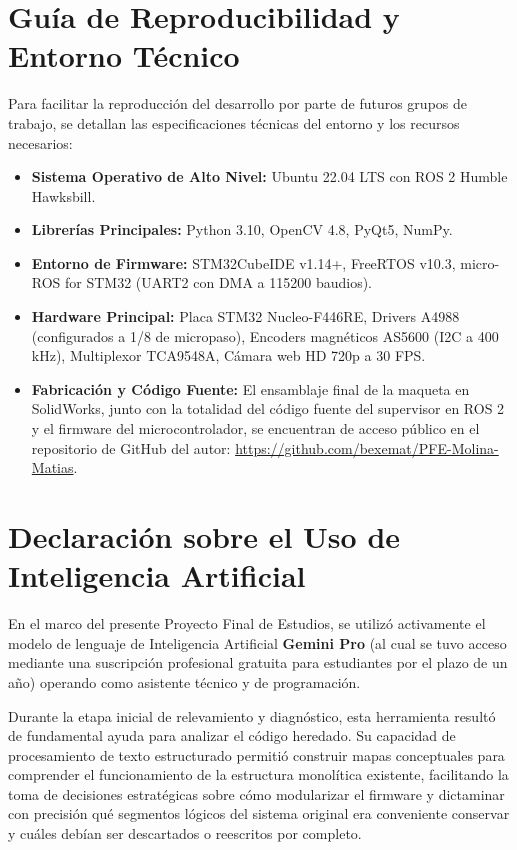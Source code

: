 \documentclass[12pt, a4paper]{report}
\begin{document}
\section{Guía de Reproducibilidad y Entorno Técnico}
Para facilitar la reproducción del desarrollo por parte de futuros grupos de trabajo, se detallan las especificaciones técnicas del entorno y los recursos necesarios:
\begin{itemize}
    \item \textbf{Sistema Operativo de Alto Nivel:} Ubuntu 22.04 LTS con ROS 2 Humble Hawksbill.
    \item \textbf{Librerías Principales:} Python 3.10, OpenCV 4.8, PyQt5, NumPy.
    \item \textbf{Entorno de Firmware:} STM32CubeIDE v1.14+, FreeRTOS v10.3, micro-ROS for STM32 (UART2 con DMA a 115200 baudios).
    \item \textbf{Hardware Principal:} Placa STM32 Nucleo-F446RE, Drivers A4988 (configurados a 1/8 de micropaso), Encoders magnéticos AS5600 (I2C a 400 kHz), Multiplexor TCA9548A, Cámara web HD 720p a 30 FPS.
    \item \textbf{Fabricación y Código Fuente:} El ensamblaje final de la maqueta en SolidWorks, junto con la totalidad del código fuente del supervisor en ROS 2 y el firmware del microcontrolador, se encuentran de acceso público en el repositorio de GitHub del autor: \url{https://github.com/bexemat/PFE-Molina-Matias}.
\end{itemize}

\section{Declaración sobre el Uso de Inteligencia Artificial}
En el marco del presente Proyecto Final de Estudios, se utilizó activamente el modelo de lenguaje de Inteligencia Artificial \textbf{Gemini Pro} (al cual se tuvo acceso mediante una suscripción profesional gratuita para estudiantes por el plazo de un año) operando como asistente técnico y de programación.

Durante la etapa inicial de relevamiento y diagnóstico, esta herramienta resultó de fundamental ayuda para analizar el código heredado. Su capacidad de procesamiento de texto estructurado permitió construir mapas conceptuales para comprender el funcionamiento de la estructura monolítica existente, facilitando la toma de decisiones estratégicas sobre cómo modularizar el firmware y dictaminar con precisión qué segmentos lógicos del sistema original era conveniente conservar y cuáles debían ser descartados o reescritos por completo.
\end{document}
